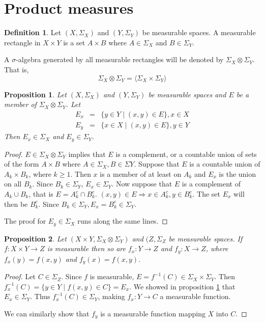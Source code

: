 \documentclass{article}
\theoremstyle{plain}
\numberwithin{thm}{section}
\theoremstyle{plain}
\newtheorem{prop}{Proposition}
\numberwithin{prop}{section}
\theoremstyle{definition}
\newtheorem{defn}{Definition}
\numberwithin{defn}{section}
\theoremstyle{remark}
\theoremstyle{plain}
\numberwithin{cor}{section}
\numberwithin{equation}{section}
\begin{document}
\section{Product measures}\label{s6}
\begin{defn}\label{s6d1}
Let $(X, \Sigma_X)$ and $(Y, \Sigma_Y)$ be measurable spaces. A measurable 
rectangle in $X \times Y$ is a set $A \times B$ where $A \in \Sigma_X$ and $B
\in \Sigma_Y$.

A $\sigma$-algebra generated by all measurable rectangles will be denoted by
$\Sigma_X \otimes \Sigma_Y$. That is,
\[
\Sigma_X \otimes \Sigma_Y = \langle\Sigma_X\times\Sigma_Y\rangle
\]
\end{defn}

\begin{prop}\label{s6p1}
Let $(X, \Sigma_X)$ and $(Y, \Sigma_Y)$ be measurable spaces and $E$ be a member
of $\Sigma_X \otimes \Sigma_Y$. Let 
\begin{eqnarray*}
E_x &=& \{y \in Y \;|\; (x, y) \in E\}, x \in X \\
E_y &=& \{x \in X \;|\; (x, y) \in E\}, y \in Y 
\end{eqnarray*}
Then $E_x \in \Sigma_X$ and $E_y \in \Sigma_Y$.
\end{prop}
\begin{proof}
$E \in \Sigma_X \otimes \Sigma_Y$ implies that $E$ is a complement,
or a countable union of sets of the form $A \times B$ where $A \in \Sigma_X, B
\in \Sigma Y$. Suppose that $E$ is a countable union of $A_k \times B_k$, where
$k \ge 1$. Then $x$ is a member of at least on $A_k$ and $E_x$ is the union on
all $B_k$. Since $B_k \in \Sigma_Y$, $E_x \in \Sigma_Y$. Now suppose that $E$ is
a complement of $A_k \cup B_k$, that is $E = A_k^c \cap B_k^c$. $(x, y) \in E
\Rightarrow x \in A_k^c, y \in B_k^c$. The set $E_x$ will then be $B_k^c$. Since
$B_k \in \Sigma_Y, E_x = B_k^c \in \Sigma_Y$.

The proof for $E_y \in \Sigma_X$ runs along the same lines.
\end{proof}

\begin{prop}\label{s6p2}
Let $(X \times Y, \Sigma_X \otimes \Sigma_Y)$ and $(Z, \Sigma_Z$ be measurable
spaces. If $f: X \times Y \rightarrow Z$ is measurable then so are $f_x: Y 
\rightarrow Z$ and $f_y: X \rightarrow Z$, where $f_x(y) = f(x, y)$ and $f_y(x)
= f(x, y)$.
\end{prop}
\begin{proof}
Let $C \in \Sigma_Z$. Since $f$ is measurable, $E = f^{-1}(C) \in \Sigma_X 
\times \Sigma_Y$. Then $f_x^{-1}(C) = \{y \in Y \;|\; f(x, y) \in C\} = E_x$.
We showed in proposition \ref{s6p1} that $E_x \in \Sigma_Y$. Thus $f_x^{-1}(C)
\in \Sigma_Y$, making $f_x: Y \rightarrow C$ a measurable function.

We can similarly show that $f_y$ is a measurable function mapping $X$ into $C$.
\end{proof}
\end{document}

